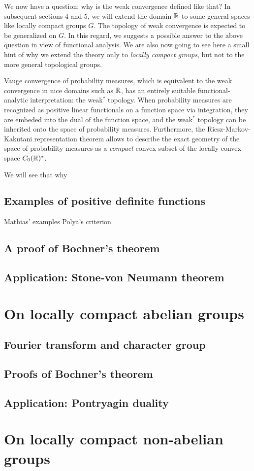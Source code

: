 \documentclass[12pt]{article}
\begin{document}
We now have a question: why is the weak convergence defined like that?
In subsequent sections 4 and 5, we will extend the domain $\mathbb{R}$ to some general spaces like locally compact groups $G$.
The topology of weak convergence is expected to be generalized on $G$.
In this regard, we suggests a possible answer to the above question in view of functional analysis.
We are also now going to see here a small hint of why we extend the theory only to \emph{locally compact groups}, but not to the more general topological groups.

Vauge convergence of probability measures, which is equivalent to the weak convergence in nice domains such as $\mathbb{R}$, has an entirely suitable functional-analytic interpretation: the weak$^*$ topology.
When probability measures are recognized as positive linear functionals on a function space via integration, they are embeded into the dual of the function space, and the weak$^*$ topology can be inherited onto the space of probability measures.
Furthermore, the Riesz-Markov-Kakutani representation theorem allows to describe the exact geometry of the space of probability measures as a \emph{compact} convex subset of the locally convex space $C_0(\mathbb{R})^*$.

We will see that why 





\subsection{Examples of positive definite functions}
Mathias' examples
Polya's criterion

\subsection{A proof of Bochner's theorem}


\subsection{Application: Stone-von Neumann theorem}






\section{On locally compact abelian groups}

\subsection{Fourier transform and character group}
\subsection{Proofs of Bochner's theorem}
\subsection{Application: Pontryagin duality}


\section{On locally compact non-abelian groups}





\end{document}

